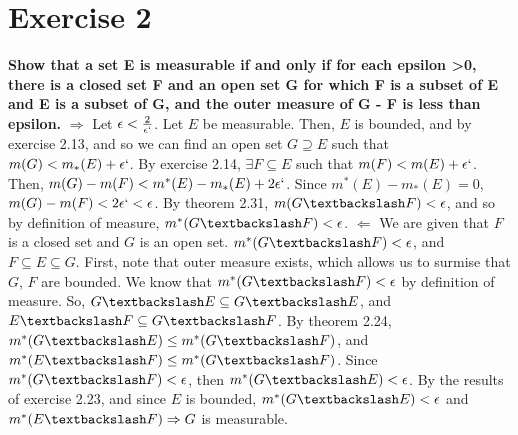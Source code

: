 \documentclass[paper=a4, fontsize=11pt]{scrartcl} %
\begin{document}
\section*{Exercise 2}
\textbf{Show that a set E is measurable if and only if for each epsilon >0, there is a closed set F and an open set G for which F is a subset of E and E is a subset of G, and the outer measure of G - F is less than epsilon.}
\newline
$\Rightarrow$
\newline
Let $\epsilon < \frac{2}{\epsilon`}$.
Let $E$ be measurable.  Then, $E$ is bounded, and by exercise 2.13, and so we can find an open set $G \supseteq E$ such that $m(G) < m_*(E) + \epsilon`$.
\newline
By exercise 2.14, $\exists F \subseteq E$ such that $m(F) < m(E) + \epsilon`$.  Then, $m(G) - m(F) < m^*(E) - m_*(E) + 2\epsilon`$.  Since $m^*(E)-m_*(E) =0$, $m(G) - m(F) < 2\epsilon` < \epsilon$.  By theorem 2.31, $m(G \textbackslash F) < \epsilon$, and so by definition of measure, $m^*(G\textbackslash F)< \epsilon$.
\newline
$\Leftarrow$
\newline
We are given that $F$ is a closed set and $G$ is an open set.  $m^*(G\textbackslash F) < \epsilon$, and $F \subseteq E \subseteq G$.
\newline
First, note that outer measure exists, which allows us to surmise that $G$, $F$ are bounded.
\newline
We know that $m^*(G \textbackslash F) < \epsilon$ by definition of measure.
\newline
So, $G \textbackslash E \subseteq G \textbackslash E$, and $E \textbackslash F \subseteq G \textbackslash F$.
\newline
By theorem 2.24, $m^*(G \textbackslash E) \leq m^*(G \textbackslash F)$, and $m^*(E \textbackslash F)\leq m^*(G \textbackslash F)$.
\newline
Since $m^*(G \textbackslash F) < \epsilon$, then $m^*(G \textbackslash E) < \epsilon$.
By the results of exercise 2.23, and since $E$ is bounded, $m^*(G \textbackslash E) < \epsilon$ and $m^*(E \textbackslash F) \Rightarrow G$ is measurable. 



\end{document}
